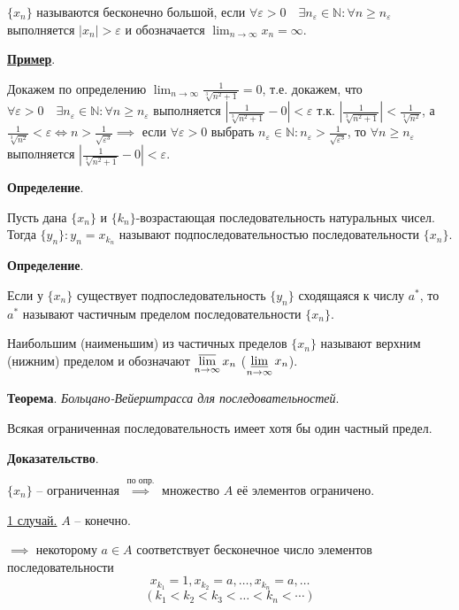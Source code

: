 \documentclass{article}
\begin{document}
$\{x_n\}$ называются бесконечно большой, если
$\forall \varepsilon > 0 \quad \exists n_\varepsilon \in \mathbb{N}:
\forall n \ge n_\varepsilon$ выполняется $|x_n| > \varepsilon$ и
обозначается $\displaystyle\lim_{n \to \infty} x_n = \infty$.

\pagebreak

\underline{\textbf{Пример}}.

Докажем по определению 
$\displaystyle\lim_{n \to \infty} \frac{1}{\sqrt[3]{n^2 + 1}} = 0$,
т.е. докажем, что $\forall \varepsilon > 0 \quad \exists n_\varepsilon \in \mathbb{N}:
\forall n \ge n_\varepsilon$ выполняется $\left|\frac{1}{\sqrt[3]{n^2 + 1}} - 0\right| < \varepsilon$
т.к. $\left|\frac{1}{\sqrt[3]{n^2 + 1}}\right| < \frac{1}{\sqrt[3]{n^2}}$,
а $\frac{1}{\sqrt[3]{n^2}} < \varepsilon \Leftrightarrow n > \frac{1}{\sqrt{\varepsilon^3}}
\implies$ если $\forall \varepsilon > 0$ выбрать 
$n_\varepsilon \in \mathbb{N}: n_\varepsilon > \frac{1}{\sqrt{\varepsilon^3}}$,
то $\forall n \ge n_\varepsilon$ выполняется $\left|\frac{1}{\sqrt[3]{n^2 + 1}} - 0\right| < \varepsilon$.

\textbf{Определение}.

Пусть дана $\{x_n\}$ и $\{k_n\}$-возрастающая последовательность натуральных чисел.
Тогда $\{y_n\}: y_n = x_{k_n}$ называют подпоследовательностью последовательности $\{x_n\}$.

\textbf{Определение}.

Если у $\{x_n\}$ существует подпоследовательность $\{y_n\}$ сходящаяся к числу $a^*$,
то $a^*$ называют частичным пределом последовательности $\{x_n\}$.

Наибольшим (наименьшим) из частичных пределов $\{x_n\}$ называют верхним (нижним) пределом
и обозначают $\displaystyle\varlimsup_{n \to \infty} x_n$
($\displaystyle\varliminf_{n \to \infty} x_n$).

\textbf{Теорема}. \textit{Больцано-Вейерштрасса для последовательностей}.

Всякая ограниченная последовательность имеет хотя бы один частный предел.

\textbf{Доказательство}.

$\{x_n\}$ -- ограниченная $\stackrel{\text{по опр.}}{\implies}$ множество $A$ её
элементов ограничено.

\underline{1 случай.} $A$ -- конечно.

$\implies$ некоторому $a \in A$ соответствует бесконечное число элементов последовательности 
\[x_{k_1} = 1, x_{k_2} = a, \dots, x_{k_n} = a, \dots\]
\[(k_1 < k_2 < k_3 < \dots < k_n < \cdots)\]
\end{document}
